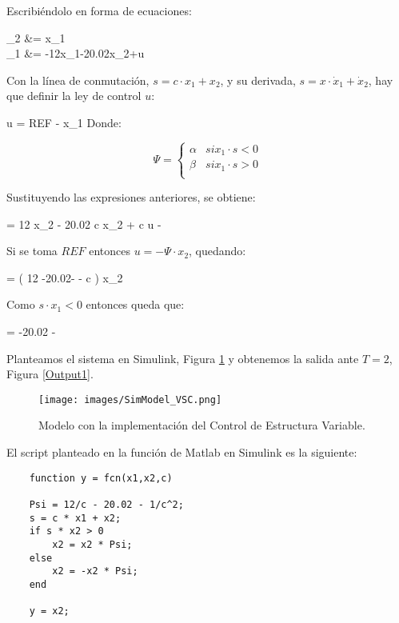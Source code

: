 \documentclass[a4paper, fontsize=11pt]{scrartcl} %
\numberwithin{equation}{section} %
\numberwithin{figure}{section} %
\numberwithin{table}{section} %
\newenvironment{myalign}{\par\nobreak\large\noindent\align}{\endalign} %
\begin{document}
	Escribiéndolo en forma de ecuaciones:
	\begin{myalign}
		\begin{split}
			_2 &= x_1\\
			_1 &= -12\cdot x_1-20.02\cdot x_2+u
		\end{split}
	\end{myalign}
	
	Con la línea de conmutación, $s = c \cdot x_1 + x_2$, y su derivada, $s = x \cdot \dot{x}_1 + \dot{x}_2$, hay que definir la ley de control $u$:
	\begin{myalign}
		u = REF - \Psi x_1
	\end{myalign}
	Donde: 
	
	\[ \Psi =
	\begin{cases}
	\alpha &  si x_1\cdot s<0\\
	\beta  &  si x_1\cdot s>0\\
	\end{cases}
	\]
	
	Sustituyendo las expresiones anteriores, se obtiene:
	
	\begin{myalign}
		 = 12 \cdot x_2 - 20.02 \cdot c \cdot x_2 + c \cdot u - 
	\end{myalign}
	
	Si se toma $REF$ entonces $u=-\Psi \cdot x_2$, quedando:
	\begin{myalign}
		 = \left( 12 -20.02\cdot -  - \Psi \cdot c \right)  \cdot x_2
	\end{myalign}
	
	Como $s \cdot x_1 < 0$ entonces queda que:
	
	\begin{myalign}
		\Psi =  -20.02 - 
	\end{myalign}
	
	Planteamos el sistema en Simulink, Figura \ref{VSC1} y obtenemos la salida ante $T = 2$, Figura \ref{Output1}.
	
	\begin{figure}[h!]
		\centering
		\texttt{[image: images/SimModel\_VSC.png]}
		\caption{Modelo con la implementación del Control de Estructura Variable.}
		\label{VSC1}
	\end{figure}
	\FloatBarrier
	
	El script planteado en la función de Matlab en Simulink es la siguiente:
	
	\begin{lstlisting}
	function y = fcn(x1,x2,c)
	
	Psi = 12/c - 20.02 - 1/c^2;
	s = c * x1 + x2;
	if s * x2 > 0
		x2 = x2 * Psi;
	else
		x2 = -x2 * Psi;
	end
	
	y = x2;
	\end{lstlisting}
	
\end{document}
